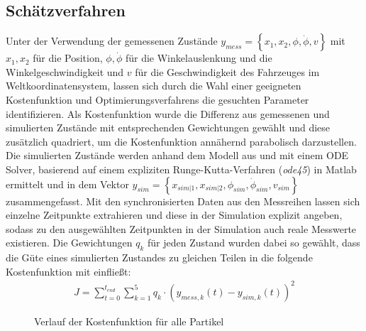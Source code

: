 \subsection{Schätzverfahren}
Unter der Verwendung der gemessenen Zustände $y_{mess} = \left \{x_1, x_2, \phi, \dot{\phi}, v  \right \}$ mit $x_1, x_2$ für die Position, $\phi, \dot{\phi}$ für die Winkelauslenkung und die Winkelgeschwindigkeit und $v$ für die Geschwindigkeit des Fahrzeuges im Weltkoordinatensystem, lassen sich durch die Wahl einer geeigneten Kostenfunktion und Optimierungsverfahrens die gesuchten Parameter identifizieren. Als Kostenfunktion wurde die Differenz aus gemessenen und simulierten Zustände mit entsprechenden Gewichtungen gewählt und diese zusätzlich quadriert, um die Kostenfunktion annähernd parabolisch darzustellen. Die simulierten Zustände werden anhand dem Modell aus \cite{VikAnd} und mit einem ODE Solver, basierend auf einem expliziten Runge-Kutta-Verfahren (\textit{ode45}) in Matlab ermittelt und in dem Vektor $y_{sim} = \left \{x_{sim|1}, x_{sim|2}, \phi_{sim}, \dot{\phi}_{sim}, v_{sim}  \right \}$ zusammengefasst. Mit den synchronisierten Daten aus den Messreihen lassen sich einzelne Zeitpunkte extrahieren und diese in der Simulation explizit angeben, sodass zu den ausgewählten Zeitpunkten in der Simulation auch reale Messwerte existieren. Die Gewichtungen $q_k$ für jeden Zustand wurden dabei so gewählt, dass die Güte eines simulierten Zustandes zu gleichen Teilen in die folgende Kostenfunktion mit einfließt:
\begin{align*}
J = \sum_{t=0}^{t_{end}}\sum_{k = 1}^{5} q_k\cdot  \left (y_{mess, k}\left ( t \right ) - y_{sim, k}\left ( t \right )  \right )^2
\end{align*}
\begin{figure} 
 \GenerationLokal
\centering
{}
\caption{Verlauf der Kostenfunktion für alle Partikel}
\label{pict:PSOallePart}
\end{figure}
